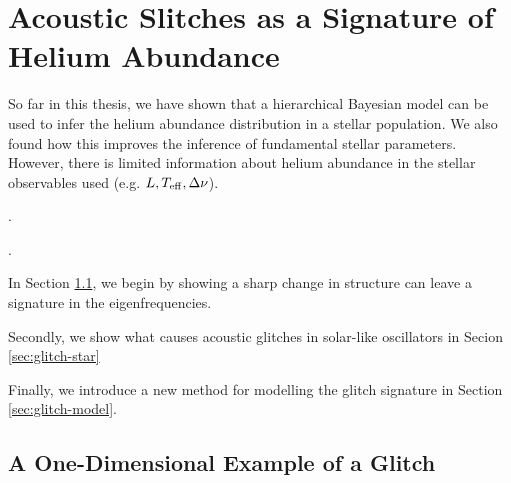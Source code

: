 %
%
%
%
%
\chapter[Acoustic Glitches]{Acoustic Slitches as a Signature of Helium Abundance}\label{chap:glitch}

So far in this thesis, we have shown that a hierarchical Bayesian model can be used to infer the helium abundance distribution in a stellar population. We also found how this improves the inference of fundamental stellar parameters. However, there is limited information about helium abundance in the stellar observables used (e.g. \(L, {T_\mathrm{eff}}, \Delta\nu\)).

.

.

In Section \ref{sec:1d-glitch}, we begin by showing a sharp change in structure can leave a signature in the eigenfrequencies.

Secondly, we show what causes acoustic glitches in solar-like oscillators in Secion \ref{sec:glitch-star}

Finally, we introduce a new method for modelling the glitch signature in Section \ref{sec:glitch-model}. 

\section[1D example]{A One-Dimensional Example of a Glitch}\label{sec:1d-glitch}

